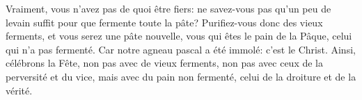 Vraiment, vous n’avez pas de quoi être fiers:
	ne savez-vous pas qu’un peu de levain suffit
		pour que fermente toute la pâte?
Purifiez-vous donc des vieux ferments, et vous serez une pâte nouvelle,
	vous qui êtes le pain de la Pâque, celui qui n’a pas fermenté.
Car notre agneau pascal a été immolé:
	c’est le Christ.
Ainsi, célébrons la Fête, non pas avec de vieux ferments,
	non pas avec ceux de la perversité et du vice,
	mais avec du pain non fermenté, celui de la droiture et de la vérité.
